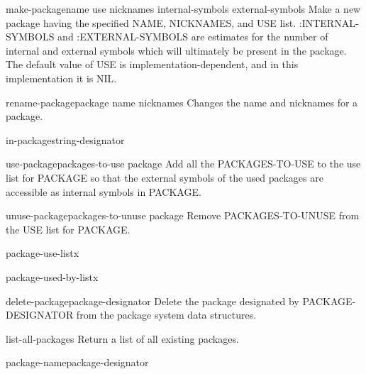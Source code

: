 \documentclass[10pt,english]{book}
\begin{document}
\begin{function}{make-package}{name \key use nicknames internal-symbols external-symbols}
  Make a new package having the specified NAME, NICKNAMES, and USE
list. :INTERNAL-SYMBOLS and :EXTERNAL-SYMBOLS are estimates for the number of
internal and external symbols which will ultimately be present in the package.
The default value of USE is implementation-dependent, and in this
implementation it is NIL.
\end{function}

\begin{function}{rename-package}{package name \op nicknames}
  Changes the name and nicknames for a package.
\end{function}

\begin{macro}{in-package}{string-designator}
  
\end{macro}

\begin{function}{use-package}{packages-to-use \op package}
  Add all the PACKAGES-TO-USE to the use list for PACKAGE so that the
external symbols of the used packages are accessible as internal symbols in
PACKAGE.
\end{function}

\begin{function}{unuse-package}{packages-to-unuse \op package}
  Remove PACKAGES-TO-UNUSE from the USE list for PACKAGE.
\end{function}

\begin{function}{package-use-list}{x}
  
\end{function}

\begin{function}{package-used-by-list}{x}
  
\end{function}

\begin{function}{delete-package}{package-designator}
  Delete the package designated by PACKAGE-DESIGNATOR from the package
  system data structures.
\end{function}

\begin{function}{list-all-packages}{}
  Return a list of all existing packages.
\end{function}

\begin{function}{package-name}{package-designator}
  
\end{function}
\end{document}
